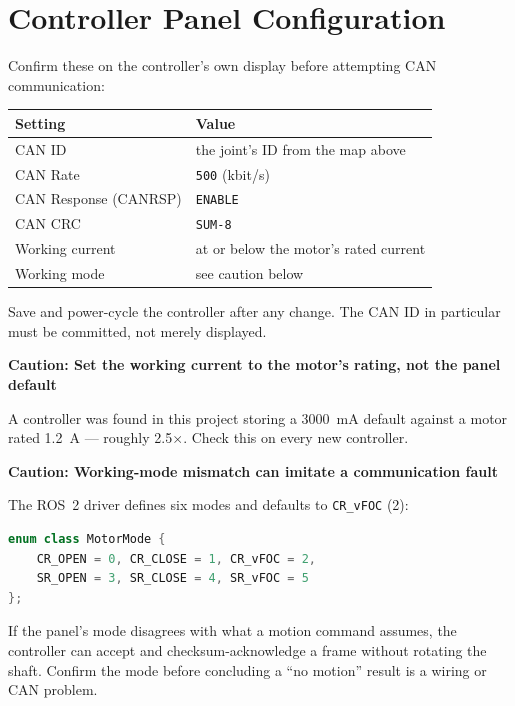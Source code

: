 \documentclass[11pt,letterpaper]{article}
\newenvironment{caution}[1]{%
    \par\addvspace{8pt}%
    \noindent{\color{cautionred}\rule{\linewidth}{0.8pt}}\par\vspace{2pt}
    \noindent\textbf{\color{cautionred}Caution: #1}\par\vspace{2pt}
}{%
    \par\vspace{2pt}\noindent{\color{cautionred}\rule{\linewidth}{0.4pt}}%
    \par\addvspace{8pt}%
}
\begin{document}
\section{Controller Panel Configuration}
\label{sec:panel}

Confirm these on the controller's own display before attempting CAN communication:

\begin{table}[h]
\centering
\begin{tabular}{ll}
\toprule
\textbf{Setting} & \textbf{Value} \\ \midrule
CAN ID                & the joint's ID from the map above \\
CAN Rate              & \texttt{500} (kbit/s) \\
CAN Response (CANRSP) & \texttt{ENABLE} \\
CAN CRC               & \texttt{SUM-8} \\
Working current       & at or below the motor's rated current \\
Working mode          & see caution below \\
\bottomrule
\end{tabular}
\end{table}

Save and power-cycle the controller after any change. The CAN ID in particular must
be committed, not merely displayed.

\begin{caution}{Set the working current to the motor's rating, not the panel default}
A controller was found in this project storing a 3000~mA default against a motor
rated 1.2~A --- roughly 2.5$\times$. Check this on every new controller.
\end{caution}

\begin{caution}{Working-mode mismatch can imitate a communication fault}
The ROS~2 driver defines six modes and defaults to \texttt{CR\_vFOC} (2):
\begin{lstlisting}[language=C++]
enum class MotorMode {
    CR_OPEN = 0, CR_CLOSE = 1, CR_vFOC = 2,
    SR_OPEN = 3, SR_CLOSE = 4, SR_vFOC = 5
};
\end{lstlisting}
If the panel's mode disagrees with what a motion command assumes, the controller can
accept and checksum-acknowledge a frame without rotating the shaft. Confirm the mode
before concluding a ``no motion'' result is a wiring or CAN problem.
\end{caution}
\end{document}
